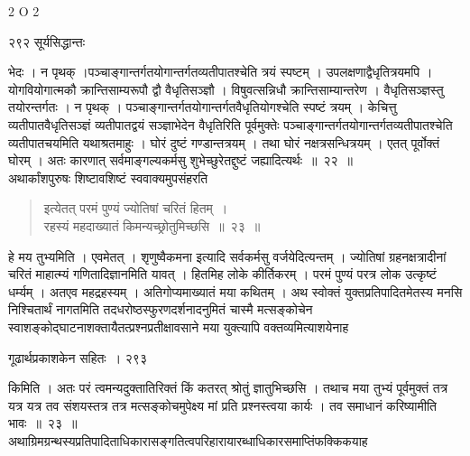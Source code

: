 \documentclass[11pt, openany]{book}
\begin{document}
{\tiny{2 O 2}}

\newpage



\noindent २९२ \hspace{4cm} सूर्यसिद्धान्तः 
\vspace{1cm}


\noindent भेदः । न पृथक् ।पञ्चाङ्गान्तर्गतयोगान्तर्गतव्यतीपातश्चेति त्रयं स्पष्टम् । उपलक्षणाद्वैधृतित्रयमपि । योगवियोगात्मकौ क्रान्तिसाम्यरूपौ द्वौ वैधृतिसञ्ज्ञौ । विषुवत्सन्निधौ क्रान्तिसाम्यान्तरेण । वैधृतिसञ्ज्ञस्तु तयोरन्तर्गतः । न पृथक् । पञ्चाङ्गान्तर्गतयोगान्तर्गतवैधृतियोगश्चेति स्पष्टं त्रयम् । केचित्तु व्यतीपातवैधृतिसञ्ज्ञं व्यतीपातद्वयं सञ्ज्ञाभेदेन वैधृतिरिति पूर्वमुक्तेः पञ्चाङ्गान्तर्गतयोगान्तर्गतव्यतीपातश्चेति व्यतीपातचयमिति यथाश्रतमाहुः । घोरं दुष्टं गण्डान्तत्रयम् । तथा घोरं नक्षत्रसन्धित्रयम् । एतत् पूर्वोक्तं घोरम् । अतः कारणात् सर्वमाङ्गल्यकर्मसु शुभेच्छुरेतद्दुष्टं जह्यादित्यर्थः~॥~२२~॥\\ 
\noindent अथार्कांशपुरुषः शिष्टावशिष्टं स्ववाक्यमुपसंहरति \textendash

\begin{quote}
{\ssi इत्येतत् परमं पुण्यं ज्योतिषां चरितं हितम्~।\\
रहस्यं महदाख्यातं किमन्यच्छ्रोतुमिच्छसि~॥~२३~॥ }
\end{quote}
 हे मय तुभ्यमिति । एवमेतत् । शृणुष्वैकमना इत्यादि सर्वकर्मसु वर्जयेदित्यन्तम् । ज्योतिषां ग्रहनक्षत्रादीनां चरितं माहात्म्यं गणितादिज्ञानमिति यावत् । हितमिह लोके कीर्तिकरम् । परमं पुण्यं परत्र लोक उत्कृष्टं धर्म्यम् । अतएव महद्रहस्यम् । अतिगोप्यमाख्यातं मया कथितम् । अथ स्वोक्तं युक्तप्रतिपादितमेतस्य मनसि निश्चितार्थं नागतमिति तदधरोष्ठस्फुरणदर्शनादनुमितं चास्मै मत्सङ्कोचेन स्वाशङ्कोद्घाटनाशक्तायैतत्प्रश्नप्रतीक्षावसाने मया युक्त्यापि वक्तव्यमित्याशयेनाह\textendash


\newpage

\hspace{3cm} गूढार्थप्रकाशकेन सहितः~। \hfill २९३
\vspace{1cm}


\noindent किमिति । अतः परं त्वमन्यदुक्तातिरिक्तं किं कतरत् श्रोतुं ज्ञातुभिच्छसि । तथाच मया तुभ्यं पूर्वमुक्तं तत्र यत्र यत्र तव संशयस्तत्र तत्र मत्सङ्कोचमुपेक्ष्य मां प्रति प्रश्नस्त्वया कार्यः । तव समाधानं करिष्यामीति भावः~॥~२३~॥\\
\noindent अथाग्रिमग्रन्थस्यप्रतिपादिताधिकारासङ्गतित्वपरिहारायारब्धाधिकारसमाप्तिंफक्किकयाह\textendash 
\end{document}
